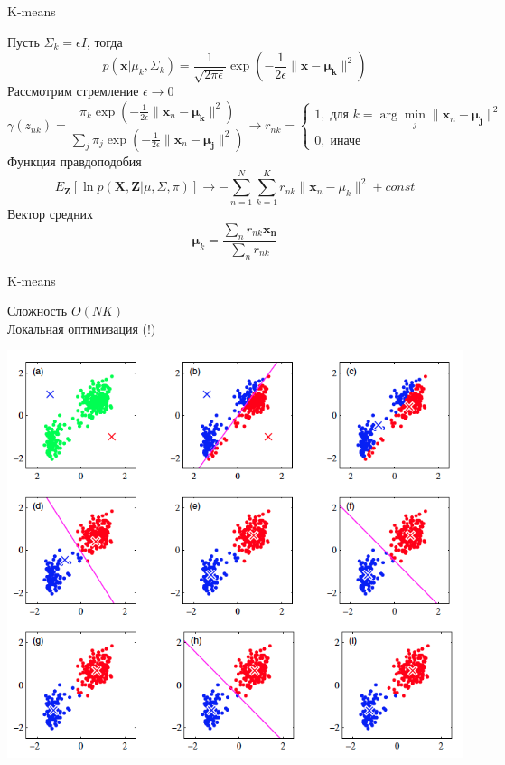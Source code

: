\documentclass[10pt]{beamer}
\begin{document}
\begin{frame}{K-means}

Пусть $\Sigma_k = \epsilon I$, тогда
\[
p(\mathbf{x} | \mu_k, \Sigma_k) = \frac{1}{\sqrt{2\pi\epsilon}}\exp(-\frac{1}{2\epsilon}\|\mathbf{x}-\mathbf{\mu_k}\|^2)
\]
Рассмотрим стремление $\epsilon \rightarrow 0$
\[
\gamma(z_{nk}) = \frac{\pi_k \exp(-\frac{1}{2\epsilon}\|\mathbf{x}_n-\mathbf{\mu_k}\|^2)}{\sum_j \pi_j \exp(-\frac{1}{2\epsilon}\|\mathbf{x}_n-\mathbf{\mu_j}\|^2)} \rightarrow r_{nk} = \begin{cases}
1, \; \text{для } k = \arg \min_j \|\mathbf{x}_n - \mathbf{\mu_j}\|^2 \\
0, \; \text{иначе}
\end{cases}
\]
Функция правдоподобия
\[
E_\mathbf{Z}[\ln p(\mathbf{X}, \mathbf{Z} | \mu, \Sigma, \pi)] \rightarrow -\sum_{n=1}^N \sum_{k=1}^K r_{nk} \| \mathbf{x}_n - \mu_k \|^2 + const
\]
Вектор средних
\[
\mathbf{\mu}_k = \frac{\sum_n r_{nk} \mathbf{x_n}}{\sum_n r_{nk}} 
\]

\end{frame}

\begin{frame}{K-means}

\kmeans
Сложность $O(NK)$ \\
Локальная оптимизация (!)

\end{frame}

\begin{frame}{}

\begin{center}
\includegraphics[scale=0.35]{images/kmeans.png}
\end{center}

\end{frame}
\end{document}
